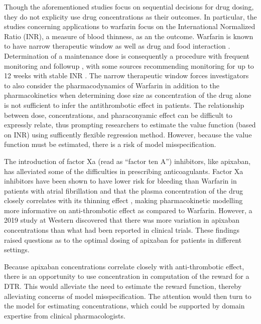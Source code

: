 Though the aforementioned studies focus on sequential decisions for drug dosing, they do not explicity use drug concentrations as their outcomes. In particular, the studies concerning applications to warfarin focus on the International Normalized Ratio (INR), a measure of blood thinness, as an the outcome. Warfarin is known to have narrow therapeutic window \cite{merli2009warfarin} as well as drug and food interaction \cite{juurlink2007drug}. Determination of a maintenance dose is consequently a procedure with frequent monitoring and followup \cite{carris2015feasibility}, with some sources recommending monitoring for up to 12 weeks with stable INR \cite{holbrook2012evidence}. The narrow therapeutic window forces investigators to also consider the pharmacodynamics of Warfarin in addition to the pharmacokinetics when determining dose size as concentration of the drug alone is not sufficient to infer the antithrombotic effect in patients. The relationship between dose, concentrations, and pharaconyamic effect can be difficult to expressly relate, thus prompting researchers to estimate the value function (based on INR) using sufficently flexible regression method. However, because the value function must be estimated, there is a risk of model misspecification.

The introduction of factor Xa (read as ``factor ten A'') inhibitors, like apixaban, has alleviated some of the difficulties in prescribing anticoagulants. Factor Xa inhibitors have been shown to have lower risk for bleeding than Warfarin in patients with atrial fibrillation \cite{touma2015meta} and that the plasma concentration of the drug closely correlates with its thinning effect \cite{Byon2019-gf}, making pharmacokinetic modelling more informative on anti-thrombotic effect as compared to Warfarin. However, a 2019 study at Western \cite{sukumar2019apixaban} discovered that there was more variation in apixaban concentrations than what had been reported in clinical trials.  These findings raised questions as to the optimal dosing of apixaban for patients in different settings.

Because apixaban concentrations correlate closely with anti-thrombotic effect, there is an opportunity to use concentration in computation of the reward for a DTR.  This would alleviate the need to estimate the reward function, thereby alleviating concerns of model misspecification.  The attention would then turn to the model for estimating concentrations, which could be supported by domain expertise from clinical pharmacologists.

